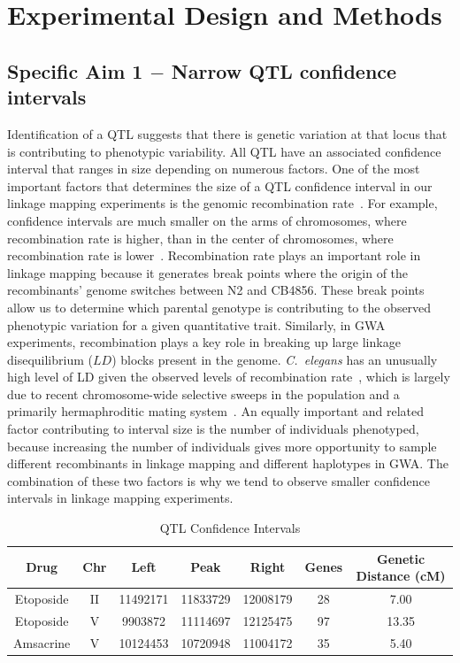\documentclass[12pt]{article}
\begin{document}
\section{Experimental Design and Methods}\label{Methods}

\subsection{Specific Aim 1 $-$ Narrow QTL confidence intervals}\label{Aim1}

Identification of a QTL suggests that there is genetic variation at that locus that is contributing to phenotypic variability. All QTL have an associated confidence interval that ranges in size depending on numerous factors. One of the most important factors that determines the size of a QTL confidence interval in our linkage mapping experiments is the genomic recombination rate~\cite{Kessner:2015hs}. For example, confidence intervals are much smaller on the arms of chromosomes, where recombination rate is higher, than in the center of chromosomes, where recombination rate is lower~\cite{Rockman:2009hb}. Recombination rate plays an important role in linkage mapping because it generates break points where the origin of the recombinants' genome switches between N2 and CB4856. These break points allow us to determine which parental genotype is contributing to the observed phenotypic variation for a given quantitative trait. Similarly, in GWA experiments, recombination plays a key role in breaking up large linkage disequilibrium ($LD$) blocks present in the genome. {\it C.~elegans} has an unusually high level of LD given the observed levels of recombination rate~\cite{Rockman:2009hb}, which is largely due to recent chromosome-wide selective sweeps in the population and a primarily hermaphroditic mating system~\cite{Andersen:2012gm}. An equally important and related factor contributing to interval size is the number of individuals phenotyped, because increasing the number of individuals gives more opportunity to sample different recombinants in linkage mapping and different haplotypes in GWA. The combination of these two factors is why we tend to observe smaller confidence intervals in linkage mapping experiments.

\begin{table}[h]
\caption{QTL Confidence Intervals}
\begin{center}
\begin{tabular}{|| c c c c c c c ||}
\hline
{\bf Drug} & {\bf Chr} & {\bf Left} & {\bf Peak} & {\bf Right} & {\bf Genes} & {\bf Genetic Distance (cM)}\\
\hline\hline
Etoposide & II & 11492171 & 11833729 & 12008179 & 28 & 7.00\\
Etoposide & V & 9903872 & 11114697 & 12125475 & 97 & 13.35\\
Amsacrine & V & 10124453 & 10720948 & 11004172 & 35 & 5.40\\
\hline 
\end{tabular}
\end{center}
\label{default}
\vspace{-15pt}
\label{Intervals}
\end{table}
\vspace{-10pt}
\end{document}
